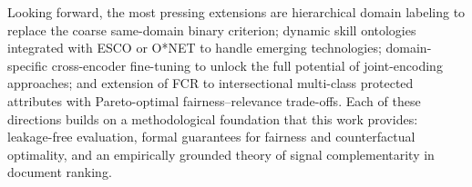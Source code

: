\documentclass{svproc}
\begin{document}
Looking forward, the most pressing extensions are hierarchical domain labeling to replace the coarse same-domain binary criterion; dynamic skill ontologies integrated with ESCO or O*NET to handle emerging technologies; domain-specific cross-encoder fine-tuning to unlock the full potential of joint-encoding approaches; and extension of FCR to intersectional multi-class protected attributes with Pareto-optimal fairness--relevance trade-offs. Each of these directions builds on a methodological foundation that this work provides: leakage-free evaluation, formal guarantees for fairness and counterfactual optimality, and an empirically grounded theory of signal complementarity in document ranking.



\end{document}

